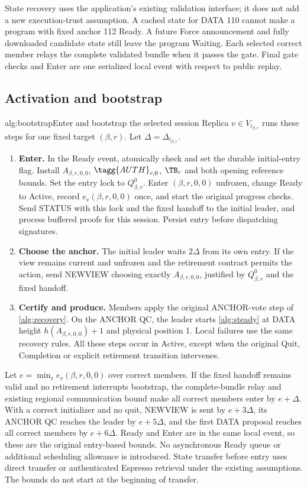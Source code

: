 State recovery uses the application's existing validation interface;
it does not add a new execution-trust assumption. A cached state for
DATA 110 cannot make a program with fixed anchor 112 Ready. A future
Force announcement and fully downloaded candidate state still leave
the program Waiting. Each selected correct member relays the complete
validated bundle when it passes the gate. Final gate checks and Enter
are one serialized local event with respect to public replay.

\subsection{Activation and bootstrap}
\label{sec:ready}
\begin{protocol}[H]{alg:bootstrap}{Enter and bootstrap the selected session}
Replica $v\in V_{i_{\beta,r}}$ runs these steps for one fixed target
$(\beta,r)$. Let $\Delta=\Delta_{i_{\beta,r}}$.
\begin{enumerate}[label=\textbf{\arabic*)},itemsep=3pt]
\item \textbf{Enter.} In the Ready event, atomically check and set
the durable initial-entry flag. Install $A_{\beta,r,0,0}$,
$\tagg{AUTH}_{r,0}$, $\TB_r$ and both opening reference bounds.
Set the entry lock to $Q^0_{\beta,r}$. Enter $(\beta,r,0,0)$
unfrozen, change Ready to Active, record $e_v(\beta,r,0,0)$ once,
and start the original progress checks. Send STATUS with this lock
and the fixed handoff to the initial leader, and process buffered
proofs for this session. Persist entry before dispatching signatures.
\item \textbf{Choose the anchor.} The initial leader waits
$2\Delta$ from its own entry. If the view remains current and
unfrozen and the retirement contract permits the action, send NEWVIEW
choosing exactly $A_{\beta,r,0,0}$, justified by $Q^0_{\beta,r}$
and the fixed handoff.
\item \textbf{Certify and produce.} Members apply the original
ANCHOR-vote step of \cref{alg:recovery}. On the ANCHOR QC, the leader
starts \cref{alg:steady} at DATA height $h(A_{\beta,r,0,0})+1$
and physical position 1. Local failures use the same recovery rules.
All these steps occur in Active, except when the original Quit,
Completion or explicit retirement transition intervenes.
\end{enumerate}
\end{protocol}

Let $e=\min_v e_v(\beta,r,0,0)$ over correct members. If the fixed
handoff remains valid and no retirement interrupts bootstrap, the
complete-bundle relay and existing regional communication bound make
all correct members enter by $e+\Delta$. With a correct initializer
and no quit, NEWVIEW is sent by $e+3\Delta$, its ANCHOR QC reaches
the leader by $e+5\Delta$, and the first DATA proposal reaches all
correct members by $e+6\Delta$. Ready and Enter are in the same local
event, so these are the original entry-based bounds. No asynchronous
Ready queue or additional scheduling allowance is introduced.
State transfer before entry uses direct transfer or authenticated
Espresso retrieval under the existing assumptions. The bounds do not
start at the beginning of transfer.

